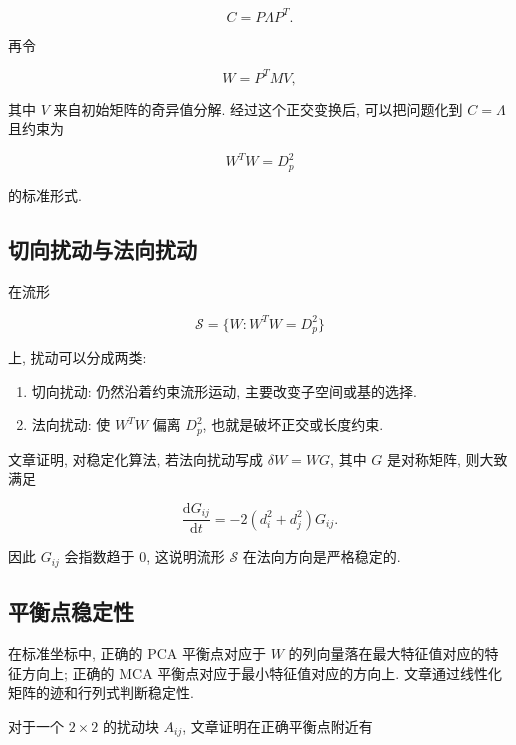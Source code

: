 \documentclass[oneside]{ctexart}
\newcommand{\dd}{\mathrm{d}}
\begin{document}
\begin{equation}
    C=P\Lambda P^T.
\end{equation}

再令

\begin{equation}
    W=P^TMV,
\end{equation}

其中 $V$ 来自初始矩阵的奇异值分解. 经过这个正交变换后, 可以把问题化到 $C=\Lambda$ 且约束为

\begin{equation}
    W^TW=D_p^2
\end{equation}

的标准形式.

\subsection{切向扰动与法向扰动}

在流形

\begin{equation}
    \mathcal{S}=\{W:W^TW=D_p^2\}
\end{equation}

上, 扰动可以分成两类:

\begin{enumerate}[(1)]
    \item 切向扰动: 仍然沿着约束流形运动, 主要改变子空间或基的选择.
    \item 法向扰动: 使 $W^TW$ 偏离 $D_p^2$, 也就是破坏正交或长度约束.
\end{enumerate}

文章证明, 对稳定化算法, 若法向扰动写成 $\delta W=WG$, 其中 $G$ 是对称矩阵, 则大致满足

\begin{equation}
    \dfrac{\dd G_{ij}}{\dd t}=-2(d_i^2+d_j^2)G_{ij}.
\end{equation}

因此 $G_{ij}$ 会指数趋于 $0$, 这说明流形 $\mathcal{S}$ 在法向方向是严格稳定的.

\subsection{平衡点稳定性}

在标准坐标中, 正确的 PCA 平衡点对应于 $W$ 的列向量落在最大特征值对应的特征方向上; 正确的 MCA 平衡点对应于最小特征值对应的方向上. 文章通过线性化矩阵的迹和行列式判断稳定性.

对于一个 $2\times 2$ 的扰动块 $A_{ij}$, 文章证明在正确平衡点附近有
\end{document}

